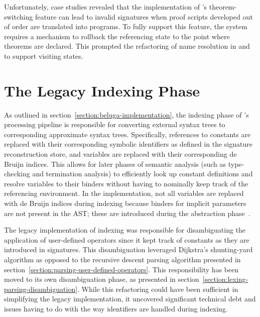 Unfortunately, case studies revealed that the implementation of \Harpoon's theorem-switching feature can lead to invalid \Beluga signatures when proof scripts developed out of order are translated into programs.
To fully support this feature, the \Beluga system requires a mechanism to rollback the referencing state to the point where theorems are declared.
This prompted the refactoring of name resolution in \Beluga and \Harpoon to support visiting states.

\section{The Legacy Indexing Phase}


As outlined in section~\ref{section:beluga-implementation}, the indexing phase of \Beluga's processing pipeline is responsible for converting external syntax trees to corresponding approximate syntax trees.
Specifically, references to constants are replaced with their corresponding symbolic identifiers as defined in the signature reconstruction store, and variables are replaced with their corresponding de Bruijn indices.
This allows for later phases of semantic analysis (such as type-checking and termination analysis) to efficiently look up constant definitions and resolve variables to their binders without having to nominally keep track of the referencing environment.
In the implementation, not all variables are replaced with de Bruijn indices during indexing because binders for implicit parameters are not present in the \ac{AST}; these are introduced during the abstraction phase~\cite{germain2010implementation}.



The legacy implementation of indexing was responsible for disambiguating the application of user-defined operators since it kept track of constants as they are introduced in \Beluga signatures.
This disambiguation leveraged Dijkstra's shunting-yard algorithm as opposed to the recursive descent parsing algorithm presented in section~\ref{section:parsing-user-defined-operators}.
This responsibility has been moved to its own disambiguation phase, as presented in section~\ref{section:lexing-parsing-disambiguation}.
While this refactoring could have been sufficient in simplifying the legacy implementation, it uncovered significant technical debt and issues having to do with the way identifiers are handled during indexing.


